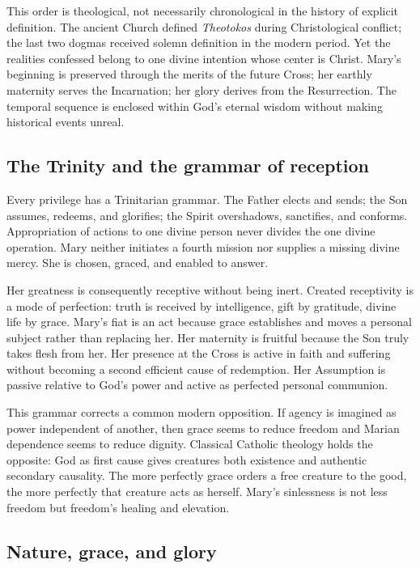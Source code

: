This order is theological, not necessarily chronological in the history of explicit definition. The ancient Church defined \emph{Theotokos} during Christological conflict; the last two dogmas received solemn definition in the modern period. Yet the realities confessed belong to one divine intention whose center is Christ. Mary's beginning is preserved through the merits of the future Cross; her earthly maternity serves the Incarnation; her glory derives from the Resurrection. The temporal sequence is enclosed within God's eternal wisdom without making historical events unreal.

\subsection{The Trinity and the grammar of reception}

Every privilege has a Trinitarian grammar. The Father elects and sends; the Son assumes, redeems, and glorifies; the Spirit overshadows, sanctifies, and conforms. Appropriation of actions to one divine person never divides the one divine operation. Mary neither initiates a fourth mission nor supplies a missing divine mercy. She is chosen, graced, and enabled to answer.

Her greatness is consequently receptive without being inert. Created receptivity is a mode of perfection: truth is received by intelligence, gift by gratitude, divine life by grace. Mary's fiat is an act because grace establishes and moves a personal subject rather than replacing her. Her maternity is fruitful because the Son truly takes flesh from her. Her presence at the Cross is active in faith and suffering without becoming a second efficient cause of redemption. Her Assumption is passive relative to God's power and active as perfected personal communion.

This grammar corrects a common modern opposition. If agency is imagined as power independent of another, then grace seems to reduce freedom and Marian dependence seems to reduce dignity. Classical Catholic theology holds the opposite: God as first cause gives creatures both existence and authentic secondary causality. The more perfectly grace orders a free creature to the good, the more perfectly that creature acts as herself. Mary's sinlessness is not less freedom but freedom's healing and elevation.

\subsection{Nature, grace, and glory}

